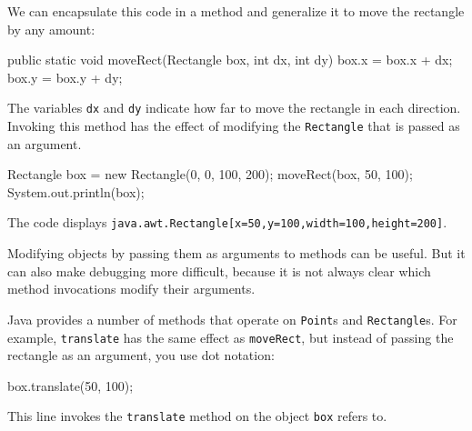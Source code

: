 \documentclass[12pt]{book}
\theoremstyle{exercise}
\newcommand{\java}[1]{\verb"#1"}
\begin{document}

We can encapsulate this code in a method and generalize it to move the rectangle by any amount:

\begin{code}
    public static void moveRect(Rectangle box, int dx, int dy) {
        box.x = box.x + dx;
        box.y = box.y + dy;
    }
\end{code}

The variables \java{dx} and \java{dy} indicate how far to move the rectangle in each direction.
Invoking this method has the effect of modifying the \java{Rectangle} that is passed as an argument.

\begin{code}
    Rectangle box = new Rectangle(0, 0, 100, 200);
    moveRect(box, 50, 100);
    System.out.println(box);
\end{code}

The code displays \java{java.awt.Rectangle[x=50,y=100,width=100,height=200]}.

Modifying objects by passing them as arguments to methods can be useful.
But it can also make debugging more difficult, because it is not always clear which method invocations modify their arguments.


Java provides a number of methods that operate on \java{Point}s and \java{Rectangle}s.
For example, \java{translate} has the same effect as \java{moveRect}, but instead of passing the rectangle as an argument, you use dot notation:

\begin{code}
    box.translate(50, 100);
\end{code}

This line invokes the \java{translate} method on the object \java{box} refers to.


\end{document}
